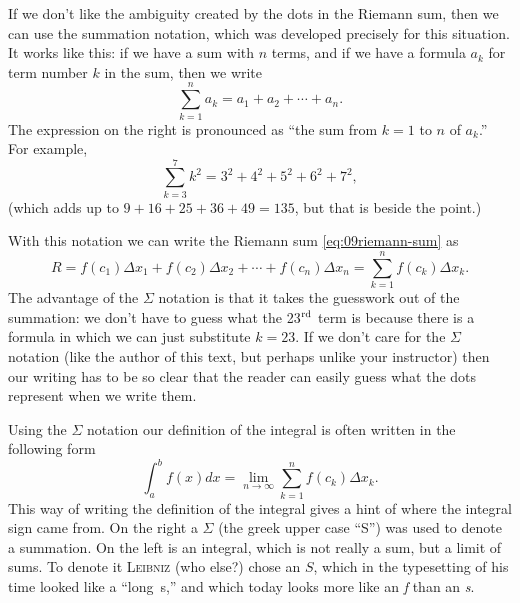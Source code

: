 If we don't like the ambiguity created by the dots in the Riemann sum, then we
can use the summation notation, which was developed precisely for this
situation.  It works like this:  if we have a sum with $n$ terms, and if we
have a formula $a_k$ for term number $k$ in the sum, then we write
\[
  \sum_{k=1}^n a_k = a_1+a_2+\cdots+a_n.
\]
The expression on the right is pronounced as ``the sum from $k=1$ to $n$ of
$a_k$.''  For example,
\[
  \sum_{k=3}^7 k^2 = 3^2 + 4^2 + 5^2 + 6^2 + 7^2,
\]
(which adds up to $9+16+25+36+49 = 135$, but that is beside the point.)

With this notation we can write the Riemann sum \eqref{eq:09riemann-sum} as
\[
  R = f(c_1)\Delta x_1 + f(c_2) \Delta x_2 + \cdots + f(c_n)\Delta x_n
  = \sum_{k=1}^n f(c_k) \Delta x_k.
\]
The advantage of the $\Sigma$ notation is that it takes the guesswork out of the
summation:  we don't have to guess what the 23$^{\rm rd}$ term is because there
is a formula in which we can just substitute $k=23$.  If we don't care for the
$\Sigma$ notation (like the author of this text, but perhaps unlike your
instructor) then our writing has to be so clear that the reader can easily
guess what the dots represent when we write them.

Using the $\Sigma$ notation our definition of the integral is often written in
the following form
\begin{equation}
  \int_a^b f(x) dx
  =
  \lim_{n\to\infty} \sum_{k=1}^n f(c_k) \Delta x_k.
  \label{eq:09integral-def-using-sigma-notation}
\end{equation}
This way of writing the definition of the integral gives a hint of where the
integral sign came from.  On the right a $\Sigma$ (the greek upper case ``S'')
was used to denote a summation.
On the left is an integral, which is not really
a sum, but a limit of sums.  To denote it \textsc{Leibniz} (who else?) chose an
$S$, which in the typesetting of his time looked like a ``long~s,'' and which today
looks more like an \textit{f} than an \textit{s}.


